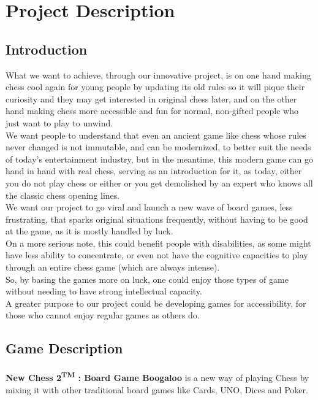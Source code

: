 \documentclass[12pt]{article}
\begin{document}
    \section{Project Description}
        \subsection{Introduction}
            What we want to achieve, through our innovative project, is on one hand making chess cool again for young people by updating its old rules so it will pique their curiosity and they may get interested in original chess later, and on the other hand making chess more accessible and fun for normal, non-gifted people who just want to play to unwind.
            \\We want people to understand that even an ancient game like chess whose rules never changed is not immutable, and can be modernized, to better suit the needs of today's entertainment industry, but in the meantime, this modern game can go hand in hand with real chess, serving as an introduction for it, as today, either you do not play chess or either or you get demolished by an expert who knows all the classic chess opening lines.
            \\We want our project to go viral and launch a new wave of board games, less frustrating, that sparks original situations frequently, without having to be good at the game, as it is mostly handled by luck.
            \\On a more serious note, this could benefit people with disabilities, as some might have less ability to concentrate, or even not have the cognitive capacities to play through an entire chess game (which are always intense).
            \\So, by basing the games more on luck, one could enjoy those types of game without needing to have strong intellectual capacity.
            \\A greater purpose to our project could be developing games for accessibility, for those who cannot enjoy regular games as others do.

        \subsection{Game Description}
            \paragraph{}
                \textbf{New Chess 2\textsuperscript{TM} : Board Game Boogaloo} is a new way of playing Chess by mixing it with other traditional board games like Cards, UNO, Dices and Poker.
\end{document}
